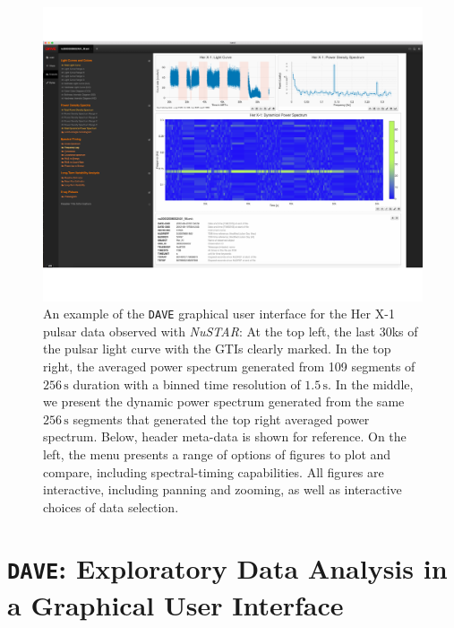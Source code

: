 \documentclass[twocolumn]{aastex62}
\newcommand{\project}[1]{\textsl{#1}\xspace}
\newcommand{\nustar}{\project{NuSTAR}\xspace}
\newcommand{\dave}{\texttt{DAVE}\xspace}
\begin{document}
\begin{figure}[htbp]
\begin{center}
\includegraphics[width=\linewidth]{../figures/dave.pdf}
\caption{An example of the \dave graphical user interface for the Her X-1 pulsar data observed with \nustar: At the top left, the last 30ks of the pulsar light curve with the GTIs clearly marked. In the top right, the averaged power spectrum generated from 109 segments of $256\,\mathrm{s}$ duration with a binned time resolution of $1.5\,\mathrm{s}$. In the middle, we present the dynamic power spectrum generated from the same $256\,\mathrm{s}$ segments that generated the top right averaged power spectrum. Below, header meta-data is shown for reference. On the left, the menu presents a range of options of figures to plot and compare, including spectral-timing capabilities. All figures are interactive, including panning and zooming, as well as interactive choices of data selection.}
\label{fig:dave}
\end{center}
\end{figure}

\section{\texttt{DAVE}: Exploratory Data Analysis in a Graphical User Interface}
\label{sec:dave}
\end{document}
